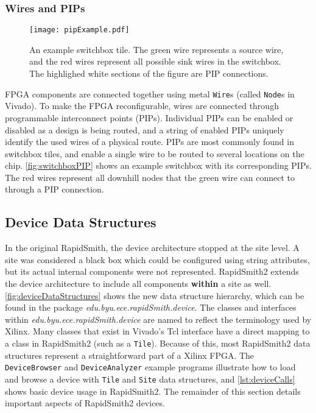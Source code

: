 \subsubsection{Wires and PIPs} \label{wireSection}
 
\begin{figure}[t!]
	\centering
	\texttt{[image: pipExample.pdf]}
	\caption{An example switchbox tile. The green wire represents a source wire,
	and the red wires represent all possible sink wires in the switchbox. The
	highlighed white sections of the figure are PIP connections.}
	\label{fig:switchboxPIP}
\end{figure} 
 
FPGA components are connected together using metal \texttt{Wire}s (called
\texttt{Node}s in Vivado). To make the FPGA reconfigurable,
wires are connected through programmable interconnect points
(PIPs). Individual PIPs can be enabled or disabled as a design is
being routed, and a string of enabled PIPs uniquely identify the
used wires of a physical route. PIPs are most commonly
found in switchbox tiles, and enable a single wire to be
routed to several locations on the chip. \autoref{fig:switchboxPIP}
shows an example switchbox with its corresponding PIPs. The red wires
represent all downhill nodes that the green wire can connect to through a PIP
connection.

\subsection{Device Data Structures} \label{devicesRS2}
In the original RapidSmith, the device architecture stopped at the
site level. A site was considered a black box which could be
configured using string attributes, but its actual internal components were
not represented. RapidSmith2 extends the device architecture to include all
components \textbf{within} a site as well. \autoref{fig:deviceDataStructures}
shows the new data structure hierarchy, which can be found in the package \emph{
edu.byu.ece.rapidSmith.device}. The classes and interfaces within
\emph{edu.byu.ece.rapid\-Smith.device} are named to reflect the terminology
used by Xilinx. Many classes that exist in Vivado's Tcl interface have a direct
mapping to a class in RapidSmith2 (such as a \texttt{Tile}). Because of this,
most RapidSmith2 data structures represent a straightforward part of a Xilinx FPGA.
The \texttt{DeviceBrowser} and \texttt{DeviceAnalyzer} example programs
illustrate how to load and browse a device with \texttt{Tile} and \texttt{Site}
data structures, and \autoref{lst:deviceCalls} shows basic device usage in
RapidSmith2. The remainder of this section details important aspects of
RapidSmith2 devices.

